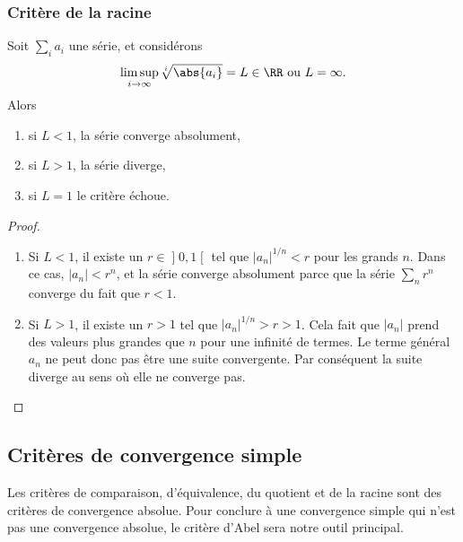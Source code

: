 \subsubsection{Critère de la racine}

\begin{proposition}
    Soit $\sum_i a_i$ une série, et considérons
    \begin{equation*}
      \limsup_{i \rightarrow \infty} \sqrt[i]{\abs{a_i}} = L \in \RR
      \text{ ou $L =
        \infty$.}
    \end{equation*}
    Alors
    \begin{enumerate}
    \item si $L < 1$, la série converge absolument,
    \item si $L> 1$, la série diverge,
    \item si $L = 1$ le critère échoue.
    \end{enumerate}
\end{proposition}

\begin{proof}
    \begin{enumerate}
        \item
            Si $L<1$, il existe un $r\in \mathopen] 0 , 1 \mathclose[$ tel que $| a_n |^{1/n}<r$ pour les grands $n$. Dans ce cas, $| a_n |<r^{n}$, et la série converge absolument parce que la série $\sum_nr^n$ converge du fait que $r<1$.
        \item
            Si $L>1$, il existe un $r>1$ tel que $| a_n |^{1/n}>r>1$. Cela fait que $| a_n |$ prend des valeurs plus grandes que $n$ pour une infinité de termes. Le terme général $a_n$ ne peut donc pas être une suite convergente. Par conséquent la suite diverge au sens où elle ne converge pas.

    \end{enumerate}
\end{proof}

\subsection{Critères de convergence simple}

Les critères de comparaison, d'équivalence, du quotient et de la racine sont des critères de convergence absolue. Pour conclure à une convergence simple qui n'est pas une convergence absolue, le critère d'Abel sera notre outil principal.  

